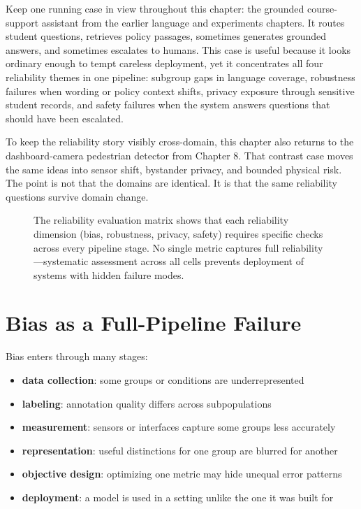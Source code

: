 Keep one running case in view throughout this chapter: the grounded course-support assistant from the earlier language and experiments chapters. It routes student questions, retrieves policy passages, sometimes generates grounded answers, and sometimes escalates to humans. This case is useful because it looks ordinary enough to tempt careless deployment, yet it concentrates all four reliability themes in one pipeline: subgroup gaps in language coverage, robustness failures when wording or policy context shifts, privacy exposure through sensitive student records, and safety failures when the system answers questions that should have been escalated.

To keep the reliability story visibly cross-domain, this chapter also returns to the dashboard-camera pedestrian detector from Chapter 8. That contrast case moves the same ideas into sensor shift, bystander privacy, and bounded physical risk. The point is not that the domains are identical. It is that the same reliability questions survive domain change.

\begin{figure}[t]
\centering
\resizebox{\linewidth}{!}{}
\caption{The reliability evaluation matrix shows that each reliability dimension (bias, robustness, privacy, safety) requires specific checks across every pipeline stage. No single metric captures full reliability—systematic assessment across all cells prevents deployment of systems with hidden failure modes.}
\label{fig:reliability-matrix}
\end{figure}

\section{Bias as a Full-Pipeline Failure}

Bias enters through many stages:
\begin{itemize}[leftmargin=*]
\item \textbf{data collection}: some groups or conditions are underrepresented
\item \textbf{labeling}: annotation quality differs across subpopulations
\item \textbf{measurement}: sensors or interfaces capture some groups less accurately
\item \textbf{representation}: useful distinctions for one group are blurred for another
\item \textbf{objective design}: optimizing one metric may hide unequal error patterns
\item \textbf{deployment}: a model is used in a setting unlike the one it was built for
\end{itemize}

